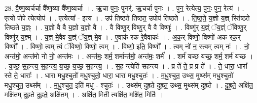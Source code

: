 \documentclass[17pt]{extarticle}
\begin{document}
28. वै॒ष्ण॒व्यर्चर्चा वै᳚ष्ण॒व्या वै᳚ष्ण॒व्यर्चा । . ऋ॒चा पुनः॒ पुनर्॑. ऋ॒चर्चा पुनः॑ । . पुन॒ रेत्येत्य॒ पुनः॒ पुन॒ रेत्य॑ । . एत्यो पोपे त्येत्योप॑ । . एत्येत्या᳚ - इत्य॑ । . उप॑ तिष्ठते तिष्ठत॒ उपोप॑ तिष्ठते । . ति॒ष्ठ॒ते॒ य॒ज्ञो य॒ज्ञ् स्ति॑ष्ठते तिष्ठते य॒ज्ञ्ः । . य॒ज्ञो वै वै य॒ज्ञो य॒ज्ञो वै । . वै विष्णु॒र् विष्णु॒र् वै वै विष्णुः॑ । . विष्णु॑र् य॒ज्ञ्ं ॅय॒ज्ञ्ं ॅविष्णु॒र् विष्णु॑र् य॒ज्ञ्म् । . य॒ज्ञ् मे॒वैव य॒ज्ञ्ं ॅय॒ज्ञ् मे॒व । . ए॒वाक॑ रक रे॒वैवाकः॑ । . अ॒क॒र् विष्णो॒ विष्णो॑ अक रक॒र् विष्णो᳚ । . विष्णो॒ त्वम् त्वं ॅविष्णो॒ विष्णो॒ त्वम् । . विष्णो॒ इति॒ विष्णो᳚ । . त्वम् नो॑ न॒ स्त्वम् त्वम् नः॑ । . नो॒ अन्त॑मो॒ अन्त॑मो नो नो॒ अन्त॑मः । . अन्त॑मः॒ शर्म॒ शर्मान्त॑मो॒ अन्त॑मः॒ शर्म॑ । . शर्म॑ यच्छ यच्छ॒ शर्म॒ शर्म॑ यच्छ । . य॒च्छ॒ स॒ह॒न्त्य॒ स॒ह॒न्त्य॒ य॒च्छ॒ य॒च्छ॒ स॒ह॒न्त्य॒ । . स॒ह॒ न्त्येति॑ सहन्त्य । . प्र ते॑ ते॒ प्र प्र ते᳚ । . ते॒ धारा॒ धारा᳚ स्ते ते॒ धाराः᳚ । . धारा॑ मधु॒श्चुतो॑ मधु॒श्चुतो॒ धारा॒ धारा॑ मधु॒श्चुतः॑ । . म॒धु॒श्चुत॒ उथ्स॒ मुथ्स॑म् मधु॒श्चुतो॑ मधु॒श्चुत॒ उथ्स᳚म् । . म॒धु॒श्चुत॒ इति॑ मधु - श्चुतः॑ । . उथ्स॑म् दुह्रते दुह्रत॒ उथ्स॒ मुथ्स॑म् दुह्रते । . दु॒ह्र॒ते॒ अक्षि॑त॒ मक्षि॑तम् दुह्रते दुह्रते॒ अक्षि॑तम् । . अक्षि॑त॒ मिती त्यक्षि॑त॒ मक्षि॑त॒ मिति॑ । \newline
\end{document}
